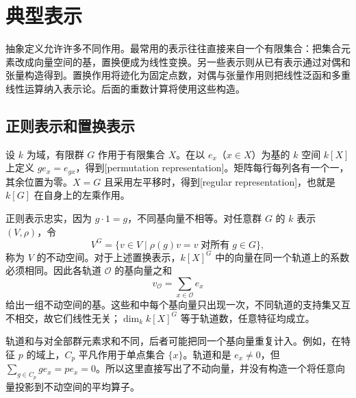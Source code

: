 

\section{典型表示}
\label{b5:sec:0102}

抽象定义允许许多不同作用。最常用的表示往往直接来自一个有限集合：把集合元素改成向量空间的基，置换便成为线性变换。另一些表示则从已有表示通过对偶和张量构造得到。置换作用将迹化为固定点数，对偶与张量作用则把线性泛函和多重线性运算纳入表示论。后面的重数计算将使用这些构造。


\subsection{正则表示和置换表示}
\label{b5:subsec:0102:01}

设 \(k\) 为域，有限群 \(G\) 作用于有限集合 \(X\)。在以 \(e_x\)（\(x\in X\)）为基的 \(k\) 空间 \(k[X]\) 上定义 \(ge_x=e_{gx}\)，得到[permutation representation]。矩阵每行每列各有一个一，其余位置为零。\(X=G\) 且采用左平移时，得到[regular representation]，也就是 \(k[G]\) 在自身上的左乘作用。

\ProseParagraphBreak
正则表示忠实，因为 \(g\cdot1=g\)，不同基向量不相等。对任意群 \(G\) 的 \(k\) 表示 \((V,\rho)\)，令
\[
	V^G=\bigl\{v\in V\mid\rho(g)v=v\;\text{对所有}\;g\in G\bigr\},
\]
称为 \(V\) 的不动空间。对于上述置换表示，\(k[X]^G\) 中的向量在同一个轨道上的系数必须相同。因此各轨道 \(\mathcal O\) 的基向量之和
\[
	v_{\mathcal O}=\sum_{x\in\mathcal O}e_x
\]
给出一组不动空间的基。这些和中每个基向量只出现一次，不同轨道的支持集又互不相交，故它们线性无关；\(\dim_k k[X]^G\) 等于轨道数，任意特征均成立。

\ProseParagraphBreak
轨道和与对全部群元素求和不同，后者可能把同一个基向量重复计入。例如，在特征 \(p\) 的域上，\(C_p\) 平凡作用于单点集合 \(\{x\}\)。轨道和是 \(e_x\ne0\)，但 \(\sum_{g\in C_p}ge_x=pe_x=0\)。所以这里直接写出了不动向量，并没有构造一个将任意向量投影到不动空间的平均算子。

